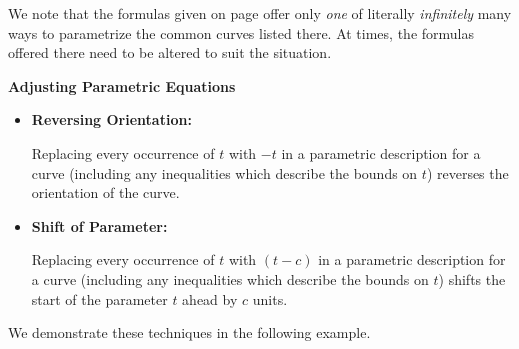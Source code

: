 We note that the formulas given on page \pageref{commonparametrizations} offer only \textit{one} of literally \textit{infinitely} many ways to parametrize the common curves listed there.  At times, the formulas offered there need to be altered to suit the situation.  

\smallskip

\colorbox{ResultColor}{\bbm

\centerline{\textbf{Adjusting Parametric Equations}}

\begin{itemize}

\item  \textbf{Reversing Orientation:}  $~$

Replacing every occurrence of $t$ with $-t$ in a parametric description for a curve (including any inequalities which describe the bounds on $t$) reverses the orientation of the curve.  

\item  \textbf{Shift of Parameter:}  $~$

Replacing every occurrence of $t$ with $(t-c)$ in a parametric description for a curve (including any inequalities which describe the bounds on $t$) shifts the start of the parameter $t$ ahead by $c$ units.

\end{itemize}

\smallskip

\ebm}

\medskip

We demonstrate these techniques in the following example.

